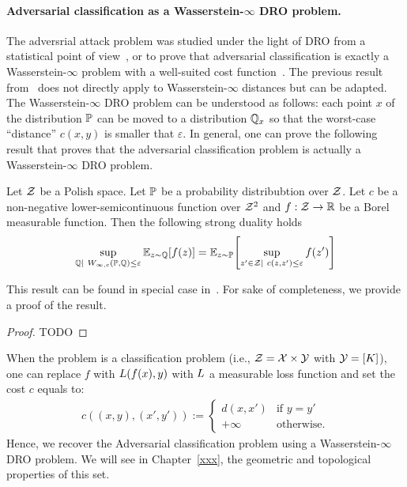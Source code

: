 \paragraph{Adversarial classification as a Wasserstein-$\infty$ DRO problem.} The adversrial attack problem was studied under the light of DRO from a statistical point of view~\citep{xxx}, or to prove that adversarial classification is exactly a Wasserstein-$\infty$ problem with a well-suited cost function~\citep{xxx}. The previous result from~\citep{blanchet2019quantifying} does not directly apply to Wasserstein-$\infty$ distances but can be adapted. The Wasserstein-$\infty$ DRO problem can be understood as follows: each point $x$ of the distribution $\mathbb{P}$ can be moved to a distribution $\mathbb{Q}_x$ so that the worst-case ``distance'' $c(x,y)$ is smaller that $\varepsilon$. In general, one can prove the following result that proves that the adversarial classification problem is actually a Wasserstein-$\infty$ DRO problem.

\begin{thm}
Let $\mathcal{Z}$ be a Polish space. Let $\mathbb{P}$ be a probability distribubtion over $\mathcal{Z}$. Let $c$ be a non-negative lower-semicontinuous function over $\mathcal{Z}^2$ and $f:\mathcal{Z}\to \mathbb{R}$ be a Borel measurable function. Then the following strong duality holds
    \begin{align*}
        \sup_{\QQ|~W_{\infty,c}(\PP,\QQ)\leq \varepsilon}\mathbb{E}_{z\sim\QQ}\left[f(z)\right] = \mathbb{E}_{z\sim\PP}\left[\sup_{z'\in \ZZ|~c(z,z')\leq\varepsilon} f(z')\right]
    \end{align*}  
\end{thm}
This result can be found in special case in~\citep{xxx}. For sake of completeness, we provide a proof of the result. 
\begin{proof}
    TODO
\end{proof}

When the problem is a classification problem (i.e., $\mathcal{Z}=\mathcal{X}\times\mathcal{Y}$ with $\mathcal{Y} = [K]$), one can replace $f$ with  $L(f(x),y)$ with $L$ a measurable loss function and set the cost $c$ equals to:
\begin{align*}
    c((x,y),(x',y')) := \left\{
        \begin{array}{ll}
            d(x,x') & \mbox{if } y = y'\\
            +\infty & \mbox{otherwise.}
        \end{array}
    \right.
\end{align*} 
Hence, we recover the Adversarial classification problem using a Wasserstein-$\infty$ DRO problem. We will see in Chapter~\ref{xxx}, the geometric and topological properties of this set. 


